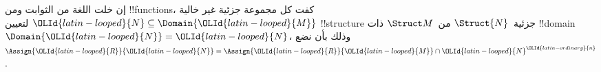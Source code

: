 \documentclass[../../../include/open-logic-section]{subfiles}
\begin{document}
\begin{rem}
إن خلت اللغة من الثوابت ومن !!{function}s، كفت كل مجموعة جزئية غير
خالية $\OLId{latin-looped}{N} \subseteq \Domain{\OLId{latin-looped}{M}}$ لتعيين !!{structure} جزئية~$\Struct{N}$
من~$\Struct M$ ذات !!{domain}~$\Domain{\OLId{latin-looped}{N}} = \OLId{latin-looped}{N}$، وذلك بأن نضع
$\Assign{\OLId{latin-looped}{R}}{\OLId{latin-looped}{N}} = \Assign{\OLId{latin-looped}{R}}{\OLId{latin-looped}{M}} \cap \OLId{latin-looped}{N}^\OLId{latin-ordinary}{n}$.
\end{rem}

\end{document}
